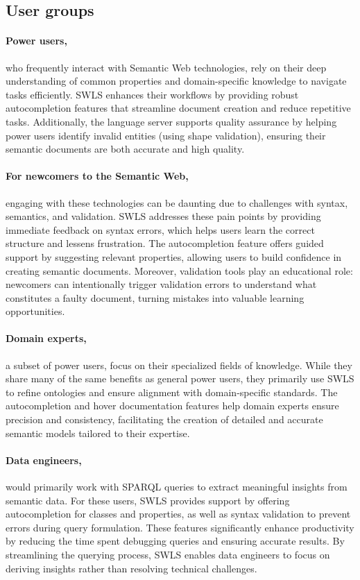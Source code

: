 \subsection{User groups}

\paragraph{Power users,} who frequently interact with Semantic Web technologies, rely on their deep understanding of common properties and domain-specific knowledge to navigate tasks efficiently.
SWLS enhances their workflows by providing robust autocompletion features that streamline document creation and reduce repetitive tasks.
Additionally, the language server supports quality assurance by helping power users identify invalid entities (using shape validation), ensuring their semantic documents are both accurate and high quality.

\paragraph{For newcomers to the Semantic Web,} engaging with these technologies can be daunting due to challenges with syntax, semantics, and validation. 
SWLS addresses these pain points by providing immediate feedback on syntax errors, which helps users learn the correct structure and lessens frustration.
The autocompletion feature offers guided support by suggesting relevant properties, allowing users to build confidence in creating semantic documents.
Moreover, validation tools play an educational role: newcomers can intentionally trigger validation errors to understand what constitutes a faulty document, turning mistakes into valuable learning opportunities.

\paragraph{Domain experts,} a subset of power users, focus on their specialized fields of knowledge. 
While they share many of the same benefits as general power users, they primarily use SWLS to refine ontologies and ensure alignment with domain-specific standards. 
The autocompletion and hover documentation features help domain experts ensure precision and consistency, facilitating the creation of detailed and accurate semantic models tailored to their expertise.

\paragraph{Data engineers,} would primarily work with SPARQL queries to extract meaningful insights from semantic data. 
For these users, SWLS provides support by offering autocompletion for classes and properties, as well as syntax validation to prevent errors during query formulation. 
These features significantly enhance productivity by reducing the time spent debugging queries and ensuring accurate results. 
By streamlining the querying process, SWLS enables data engineers to focus on deriving insights rather than resolving technical challenges.


